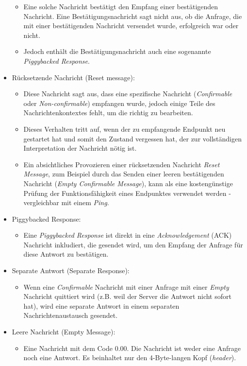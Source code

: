 \begin{itemize}
\begin{itemize}
              \item Eine solche Nachricht bestätigt den Empfang einer bestätigenden Nachricht. Eine Bestätigungsnachricht sagt nicht aus, ob die Anfrage, die mit einer bestätigenden Nachricht versendet wurde, erfolgreich war oder nicht.
              \item Jedoch enthält die Bestätigungsnachricht auch eine sogenannte \textit{Piggybacked Response}.
          \end{itemize}
    \item Rücksetzende Nachricht (Reset message):
          \begin{itemize}
              \item Diese Nachricht sagt aus, dass eine spezifische Nachricht (\textit{Confirmable} oder \textit{Non-confirmable}) empfangen wurde, jedoch einige Teile des Nachrichtenkontextes fehlt, um die richtig zu bearbeiten.
              \item Dieses Verhalten tritt auf, wenn der zu empfangende Endpunkt neu gestartet hat und somit den Zustand vergessen hat, der zur vollständigen Interpretation der Nachricht nötig ist.
              \item Ein absichtliches Provozieren einer rücksetzenden Nachricht \textit{Reset Message}, zum Beispiel durch das Senden einer leeren bestätigenden Nachricht (\textit{Empty Confirmable Message}), kann als eine kostengünstige Prüfung der Funktionsfähigkeit eines Endpunktes verwendet werden - vergleichbar mit einem \textit{Ping}.
          \end{itemize}
    \item Piggybacked Response:
          \begin{itemize}
              \item Eine \textit{Piggybacked Response} ist direkt in eine \textit{Acknowledgement} (ACK) Nachricht inkludiert, die gesendet wird, um den Empfang der Anfrage für diese Antwort zu bestätigen.
          \end{itemize}
    \item Separate Antwort (Separate Response):
          \begin{itemize}
              \item Wenn eine \textit{Confirmable} Nachricht mit einer Anfrage mit einer \textit{Empty} Nachricht quittiert wird (z.B. weil der Server die Antwort nicht sofort hat), wird eine separate Antwort in einem separaten Nachrichtenaustausch gesendet.
          \end{itemize}
    \item Leere Nachricht (Empty Message):
          \begin{itemize}
              \item Eine Nachricht mit dem Code 0.00. Die Nachricht ist weder eine Anfrage noch eine Antwort. Es beinhaltet nur den 4-Byte-langen Kopf (\textit{header}).
          \end{itemize}
\end{itemize}

